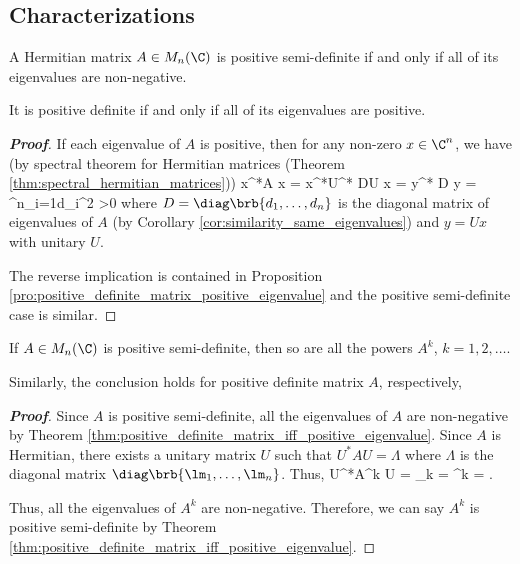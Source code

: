\subsection{Characterizations}

\begin{theorem}\label{thm:positive_definite_matrix_iff_positive_eigenvalue}
A Hermitian matrix $A\in M_n(\C)$ is positive semi-definite if and only if all of its eigenvalues are non-negative.

It is positive definite if and only if all of its eigenvalues are positive.
\end{theorem}

\begin{proof}[\bf Proof]
If each eigenvalue of $A$ is positive, then for any non-zero $x\in \C^n$, we have (by spectral theorem for Hermitian matrices (Theorem \ref{thm:spectral_hermitian_matrices}))
\be
x^*A x = x^*U^* DU x = y^* D y = \sum^n_{i=1}d_{i}^2 >0
\ee
where $D = \diag\brb{d_1,\dots,d_n}$ is the diagonal matrix of eigenvalues of $A$ (by Corollary \ref{cor:similarity_same_eigenvalues}) and $y = Ux$ with unitary $U$.

The reverse implication is contained in Proposition \ref{pro:positive_definite_matrix_positive_eigenvalue} and the positive semi-definite case is similar.
\end{proof}

\begin{corollary}\label{cor:power_of_positive_semidefinite_matrix}
If $A\in M_n(\C)$ is positive semi-definite, then so are all the powers $A^k$, $k=1,2,\dots$.

Similarly, the conclusion holds for positive definite matrix $A$, respectively,
\end{corollary}

\begin{proof}[\bf Proof]
Since $A$ is positive semi-definite, all the eigenvalues of $A$ are non-negative by Theorem \ref{thm:positive_definite_matrix_iff_positive_eigenvalue}. Since $A$ is Hermitian, there exists a unitary matrix $U$ such that $U^*AU = \Lambda$ where $\Lambda$ is the diagonal matrix $\diag\brb{\lm_1,\dots,\lm_n}$. Thus,
\be
U^*A^k U = _{k} = \Lambda^k = \diag{}.
\ee

Thus, all the eigenvalues of $A^k$ are non-negative. Therefore, we can say $A^k$ is positive semi-definite by Theorem \ref{thm:positive_definite_matrix_iff_positive_eigenvalue}.
\end{proof}



